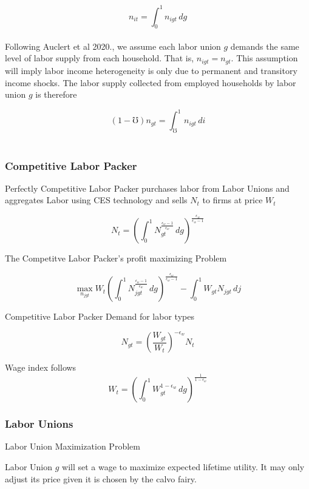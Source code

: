 \documentclass[titlepage]{\econtex}\providecommand{\texname}{BufferStockTheory}
\begin{document}
$$n_{it} = \int_{0}^{1} n_{igt}\,dg$$ \\

Following Auclert et al 2020., we assume each labor union $g$ demands the same level  of labor supply from each household. That is,   $n_{igt} =\mathit{n}_{gt}$. This assumption will imply labor income heterogeneity is only due to permanent and transitory income shocks.
The labor supply collected from employed households  by labor union $g$  is therefore 

$$  (1-\mho) \mathit{n}_{gt} = \int_{\mho}^{1} n_{igt}\,di $$ \\




\hypertarget{Competitive Labor Packer}{}
\subsubsection{Competitive Labor Packer}



Perfectly Competitive Labor Packer purchases labor from Labor Unions and  aggregates Labor using CES technology and sells $N_{t}$ to firms at price $W_{t}$


$$ N_{t} = \left(\int_{0}^{1} N_{gt}^{\frac{\epsilon_{w}-1}{\epsilon_{w}}}\,dg\right)^{\frac{\epsilon_{w}}{\epsilon_{w}-1}}$$

The Competitve Labor Packer's profit maximizing Problem 

$$ \max_{n_{jgt}} W_{t} \left(\int_{0}^{1} N_{jgt}^{\frac{\epsilon_{w}-1}{\epsilon_{w}}} \, dg \right)^ {\frac{\epsilon_{w}}{\epsilon_{w}-1}} - \int_{0}^{1} W_{gt}N_{jgt}\, dj $$


 Competitive Labor Packer Demand for labor types

$$ N_{gt} = \left(\frac{W_{gt}}{W_{t}}\right)^{-\epsilon_{w}} N_{t} $$

Wage index follows
$$ W_{t} = \left(\int_{0}^{1} W_{gt}^{1-\epsilon_{w}}\,dg\right)^{\frac{1}{1-\epsilon_{w}}}$$




\hypertarget{Labor Unions}{}
\subsubsection{Labor Unions}

Labor Union Maximization Problem

Labor Union $g$ will set a wage to maximize expected lifetime utility. It may only adjust its price given it is chosen by the calvo fairy. 
\end{document}
